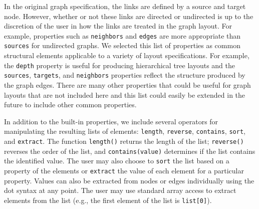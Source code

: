 In the original graph specification, the links are defined by a source
and target node. However, whether or not these links are
directed or undirected is up to the discretion of the user in how the links
are treated in the graph layout. For example, properties such as
\texttt{neighbors} and \texttt{edges} are more appropriate than \texttt{sources}
for undirected graphs. We selected this list of properties as common structural elements
applicable to a variety of layout specifications. For example, the \texttt{depth}
property is useful for producing hierarchical tree layouts and the 
\texttt{sources}, \texttt{targets}, and \texttt{neighbors} properties
reflect the structure produced by the graph edges. There are many other
properties that could be useful for graph layouts that are not included 
here and this list could easily be extended in the future to include other
common properties.

In addition to the built-in properties, we include several operators for 
manipulating the resulting lists of elements: \texttt{length}, \texttt{reverse},
\texttt{contains}, \texttt{sort}, and \texttt{extract}. The function 
\texttt{length()} returns the length of the list; \texttt{reverse()} 
reverses the order of the list, and \texttt{contains(value)} determines if
the list contains the identified value. The user may also choose to \texttt{sort} 
the list based on a property of the elements or \texttt{extract} the value of each
element for a particular property. Values can also be extracted from
nodes or edges individually using the dot syntax at any point. The user may use standard
array access to extract elements from the list (e.g., the first element of
the list is \texttt{list[0]}).


